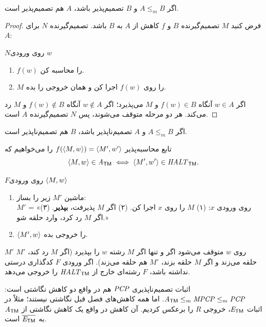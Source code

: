 \begin{theorem}\label{thm:map-dec}
اگر $A\le_m B$ و $B$ تصمیم‌پذیر باشد، $A$ هم تصمیم‌پذیر است.
\end{theorem}
\begin{proof}
فرض کنید $M$ تصمیم‌گیرنده $B$ و $f$ کاهش از $A$ به $B$ باشد. تصمیم‌گیرنده $N$ برای $A$:
\begin{algo}{$N$}{روی ورودی $w$}
\begin{enumerate}
\item $f(w)$ را محاسبه کن.
\item $M$ را روی $f(w)$ اجرا کن و همان خروجی را بده.
\end{enumerate}
\end{algo}
اگر $w\in A$ آنگاه $f(w)\in B$ و $M$ می‌پذیرد؛ اگر $w\notin A$ آنگاه $f(w)\notin B$ و $M$ رد می‌کند. هر دو مرحله متوقف می‌شوند، پس $N$ تصمیم‌گیرنده $A$ است.
\end{proof}

\begin{corollary}
اگر $A\le_m B$ و $A$ تصمیم‌ناپذیر باشد، $B$ هم تصمیم‌ناپذیر است.
\end{corollary}

\begin{example}
تابع محاسبه‌پذیر $f(\langle M,w\rangle)=\langle M',w'\rangle$ را می‌خواهیم که
\[\langle M,w\rangle\in\mathit{A}_{\mathsf{TM}}\iff\langle M',w'\rangle\in\mathit{HALT}_{\mathsf{TM}}.\]
\begin{algo}{$F$}{روی ورودی $\langle M,w\rangle$}
\begin{enumerate}
\item ماشین $M'$ زیر را بساز:\\
$M'$ = «روی ورودی $x$: (۱) $M$ را روی $x$ اجرا کن. (۲) اگر $M$ پذیرفت، \textbf{بپذیر}. (۳) اگر $M$ رد کرد، وارد حلقه شو.»
\item $\langle M',w\rangle$ را خروجی بده.
\end{enumerate}
\end{algo}
$M'$ روی $w$ متوقف می‌شود اگر و تنها اگر $M$ رشته $w$ را بپذیرد (اگر $M$ رد کند، $M'$ حلقه می‌زند و اگر $M$ حلقه بزند، $M'$ هم حلقه می‌زند). اگر ورودی $F$ کدگذاری درستی نداشته باشد، $F$ رشته‌ای خارج از $\mathit{HALT}_{\mathsf{TM}}$ را خروجی می‌دهد.
\end{example}

\begin{note}
اثبات تصمیم‌ناپذیری $\mathit{PCP}$ هم در واقع دو کاهش نگاشتی است: $\mathit{A}_{\mathsf{TM}}\le_m\mathit{MPCP}\le_m\mathit{PCP}$. اما همه کاهش‌های فصل قبل نگاشتی نیستند؛ مثلاً در اثبات $\mathit{E}_{\mathsf{TM}}$، خروجی $R$ را برعکس کردیم. آن کاهش در واقع یک کاهش نگاشتی از $\mathit{A}_{\mathsf{TM}}$ به $\overline{\mathit{E}_{\mathsf{TM}}}$ است.
\end{note}

